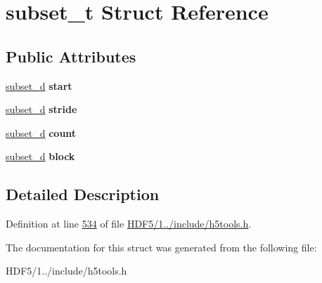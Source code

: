 \hypertarget{structsubset__t}{}\section{subset\+\_\+t Struct Reference}
\label{structsubset__t}
\subsection*{Public Attributes}
\begin{DoxyCompactItemize}
\item 
\mbox{\label{structsubset__t_a3d882bc4ac9eedcd5aa09a1fc1d88b0d}} 
\hyperlink{structsubset__d}{subset\+\_\+d} {\bfseries start}
\item 
\mbox{\label{structsubset__t_a4f8c52be9eccac20126d3510a7d8f192}} 
\hyperlink{structsubset__d}{subset\+\_\+d} {\bfseries stride}
\item 
\mbox{\label{structsubset__t_ac6d855af4f5dacb5afbc3b7ccccddff7}} 
\hyperlink{structsubset__d}{subset\+\_\+d} {\bfseries count}
\item 
\mbox{\label{structsubset__t_a06e6c8ac588603a4d1479dbfcd852ae1}} 
\hyperlink{structsubset__d}{subset\+\_\+d} {\bfseries block}
\end{DoxyCompactItemize}


\subsection{Detailed Description}


Definition at line \hyperlink{_h_d_f5_21_810_81_2include_2h5tools_8h_source_l00534}{534} of file \hyperlink{_h_d_f5_21_810_81_2include_2h5tools_8h_source}{H\+D\+F5/1../include/h5tools.\+h}.



The documentation for this struct was generated from the following file\+:\begin{DoxyCompactItemize}
\item 
H\+D\+F5/1../include/h5tools.\+h\end{DoxyCompactItemize}

